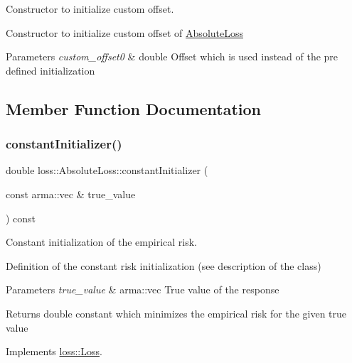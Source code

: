 Constructor to initialize custom offset. 

Constructor to initialize custom offset of {\ttfamily \hyperlink{classloss_1_1_absolute_loss}{Absolute\+Loss}}


\begin{DoxyParams}{Parameters}
{\em custom\+\_\+offset0} & {\ttfamily double} Offset which is used instead of the pre defined initialization \\
\hline
\end{DoxyParams}


\subsection{Member Function Documentation}
\mbox{\label{classloss_1_1_absolute_loss_aa2ac5fb1fdf3ce0f48decd77d375ef76}} 
\subsubsection{\texorpdfstring{constant\+Initializer()}{constantInitializer()}}
{\footnotesize\ttfamily double loss\+::\+Absolute\+Loss\+::constant\+Initializer (\begin{DoxyParamCaption}\item[{const arma\+::vec \&}]{true\+\_\+value }\end{DoxyParamCaption}) const\hspace{0.3cm}{\ttfamily [virtual]}}



Constant initialization of the empirical risk. 

Definition of the constant risk initialization (see description of the class)


\begin{DoxyParams}{Parameters}
{\em true\+\_\+value} & {\ttfamily arma\+::vec} True value of the response\\
\hline
\end{DoxyParams}
\begin{DoxyReturn}{Returns}
{\ttfamily double} constant which minimizes the empirical risk for the given true value 
\end{DoxyReturn}


Implements \hyperlink{classloss_1_1_loss_a65fe7dcd9370e6a549b8d1cc95fc8798}{loss\+::\+Loss}.

